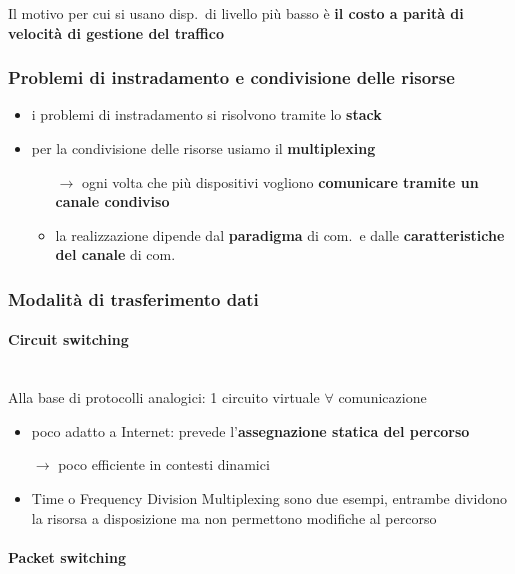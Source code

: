 \begin{emphasize}
    Il motivo per cui si usano disp.~di livello pi\`u basso \`e \textbf{il costo a parit\`a di velocit\`a di gestione del traffico}
\end{emphasize}

\subsubsection{Problemi di instradamento e condivisione delle risorse}

\begin{itemize}
  \item i problemi di instradamento si risolvono tramite lo \textbf{stack}
  \item per la condivisione delle risorse usiamo il \textbf{multiplexing}
  \begin{itemize}
    \item[$\rightarrow$] ogni volta che pi\`u dispositivi vogliono \textbf{comunicare tramite un canale condiviso}
    \item la realizzazione dipende dal \textbf{paradigma} di com.~e dalle \textbf{caratteristiche del canale} di com.
  \end{itemize}
\end{itemize}

\subsubsection{Modalit\`a di trasferimento dati}

\paragraph{Circuit switching}~\\

Alla base di protocolli analogici: 1 circuito virtuale $\forall$ comunicazione
\begin{itemize}
  \item poco adatto a Internet: prevede l'\textbf{assegnazione statica del percorso}
  \item[$\rightarrow$] poco efficiente in contesti dinamici
  \item Time o Frequency Division Multiplexing sono due esempi, entrambe dividono la risorsa a disposizione ma non permettono modifiche al percorso
\end{itemize}

\paragraph{Packet switching}~\\

